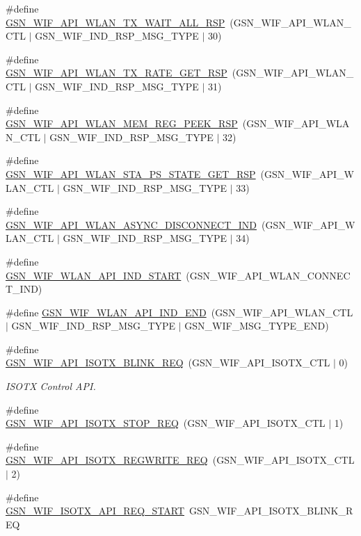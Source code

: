 \begin{DoxyCompactItemize}
\item 
\#define \hyperlink{a00606_ae4403ddde31a8f4999ec840615320aa5}{GSN\_\-WIF\_\-API\_\-WLAN\_\-TX\_\-WAIT\_\-ALL\_\-RSP}~(GSN\_\-WIF\_\-API\_\-WLAN\_\-CTL $|$ GSN\_\-WIF\_\-IND\_\-RSP\_\-MSG\_\-TYPE $|$ 30)
\item 
\#define \hyperlink{a00606_a0261724e99f5302926d5f1f03cf3cd90}{GSN\_\-WIF\_\-API\_\-WLAN\_\-TX\_\-RATE\_\-GET\_\-RSP}~(GSN\_\-WIF\_\-API\_\-WLAN\_\-CTL $|$ GSN\_\-WIF\_\-IND\_\-RSP\_\-MSG\_\-TYPE $|$ 31)
\item 
\#define \hyperlink{a00606_a8fcbe024770baf2a76e7b3f9a85c2616}{GSN\_\-WIF\_\-API\_\-WLAN\_\-MEM\_\-REG\_\-PEEK\_\-RSP}~(GSN\_\-WIF\_\-API\_\-WLAN\_\-CTL $|$ GSN\_\-WIF\_\-IND\_\-RSP\_\-MSG\_\-TYPE $|$ 32)
\item 
\#define \hyperlink{a00606_adc557f62fc089d3a452741703075a3a9}{GSN\_\-WIF\_\-API\_\-WLAN\_\-STA\_\-PS\_\-STATE\_\-GET\_\-RSP}~(GSN\_\-WIF\_\-API\_\-WLAN\_\-CTL $|$ GSN\_\-WIF\_\-IND\_\-RSP\_\-MSG\_\-TYPE $|$ 33)
\item 
\#define \hyperlink{a00606_aa1066ce81555519d97215091bf494941}{GSN\_\-WIF\_\-API\_\-WLAN\_\-ASYNC\_\-DISCONNECT\_\-IND}~(GSN\_\-WIF\_\-API\_\-WLAN\_\-CTL $|$ GSN\_\-WIF\_\-IND\_\-RSP\_\-MSG\_\-TYPE $|$ 34)
\item 
\#define \hyperlink{a00606_a50f545f68929ef78001e5172fa1b9feb}{GSN\_\-WIF\_\-WLAN\_\-API\_\-IND\_\-START}~(GSN\_\-WIF\_\-API\_\-WLAN\_\-CONNECT\_\-IND)
\item 
\#define \hyperlink{a00606_a0b65635ab7d19cab097030c6a63afac6}{GSN\_\-WIF\_\-WLAN\_\-API\_\-IND\_\-END}~(GSN\_\-WIF\_\-API\_\-WLAN\_\-CTL $|$ GSN\_\-WIF\_\-IND\_\-RSP\_\-MSG\_\-TYPE $|$ GSN\_\-WIF\_\-MSG\_\-TYPE\_\-END)
\item 
\#define \hyperlink{a00636_gaaf48f3ebb3fabb793cc8b5663aff7251}{GSN\_\-WIF\_\-API\_\-ISOTX\_\-BLINK\_\-REQ}~(GSN\_\-WIF\_\-API\_\-ISOTX\_\-CTL $|$ 0)
\begin{DoxyCompactList}\small\item\em ISOTX Control API. \end{DoxyCompactList}\item 
\#define \hyperlink{a00606_a4fc41bc8b4a53ac4f838a63d82a440cb}{GSN\_\-WIF\_\-API\_\-ISOTX\_\-STOP\_\-REQ}~(GSN\_\-WIF\_\-API\_\-ISOTX\_\-CTL $|$ 1)
\item 
\#define \hyperlink{a00606_a76d48fe893107985b120f8001db43c86}{GSN\_\-WIF\_\-API\_\-ISOTX\_\-REGWRITE\_\-REQ}~(GSN\_\-WIF\_\-API\_\-ISOTX\_\-CTL $|$ 2)
\item 
\#define \hyperlink{a00606_a2466920f393b1d4118b179abbbd22304}{GSN\_\-WIF\_\-ISOTX\_\-API\_\-REQ\_\-START}~GSN\_\-WIF\_\-API\_\-ISOTX\_\-BLINK\_\-REQ

\end{DoxyCompactItemize}
